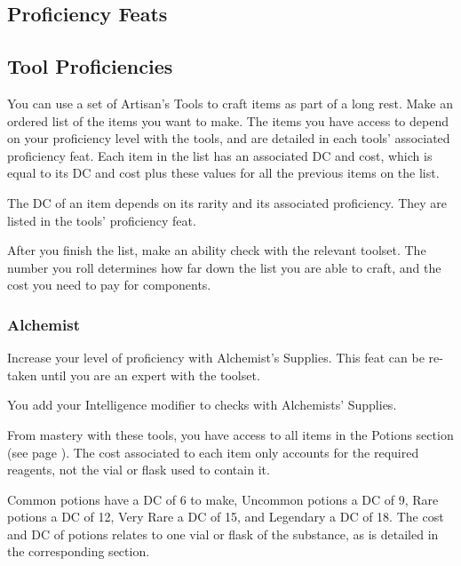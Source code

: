 \subsection*{Proficiency Feats}

\subsection*{Tool Proficiencies}
You can use a set of Artisan's Tools to craft items as part of a long rest.
Make an ordered list of the items you want to make.
The items you have access to depend on your proficiency level with the tools, and are detailed in each tools' associated proficiency feat.
Each item in the list has an associated DC and cost, which is equal to its DC and cost plus these values for all the previous items on the list.

The DC of an item depends on its rarity and its associated proficiency.
They are listed in the tools' proficiency feat.

After you finish the list, make an ability check with the relevant toolset.
The number you roll determines how far down the list you are able to craft, and the cost you need to pay for components.

\subsubsection{Alchemist} \label{feat::alchemist}
    Increase your level of proficiency with Alchemist's Supplies.
    This feat can be re-taken until you are an expert with the toolset.

    You add your Intelligence modifier to checks with Alchemists' Supplies.

    From mastery with these tools, you have access to all items in the Potions section (see page \pageref{ssec::potions}).
    The cost associated to each item only accounts for the required reagents, not the vial or flask used to contain it.

    Common potions have a DC of 6 to make, Uncommon potions a DC of 9, Rare potions a DC of 12, Very Rare a DC of 15, and Legendary a DC of 18.
    The cost and DC of potions relates to one vial or flask of the substance, as is detailed in the corresponding section.
